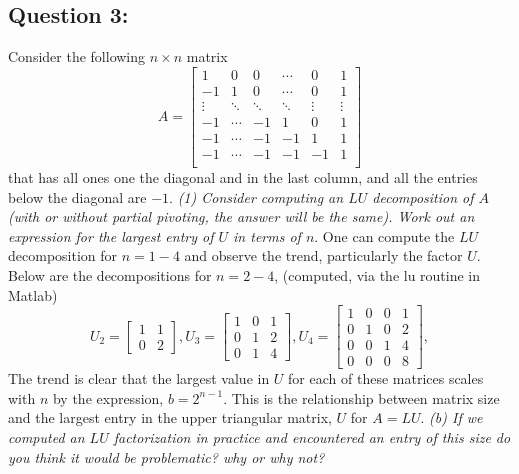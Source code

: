 \documentclass{article}
\begin{document}
\subsection*{Question 3:}
Consider the following $n \times n$ matrix
\[
A = \begin{bmatrix}
1 & 0 & 0 & \cdots & 0 & 1 \\
-1 & 1 & 0 & \cdots & 0 & 1 \\
\vdots & \ddots & \ddots & \ddots & \vdots & \vdots \\
-1  & \cdots & -1 & 1 & 0  & 1 \\
-1  & \cdots & -1 & -1 & 1  & 1 \\
-1  & \cdots & -1 & -1 & -1  & 1 \\
\end{bmatrix}
\]
that has all ones one the diagonal and in the last column, and all the entries below the diagonal are $-1.$ \newline 
\emph{ (1) Consider computing an $LU$ decomposition of $A$ (with or without partial pivoting, the answer will be the same). Work out an expression for the largest entry of $U$ in terms of $n.$ }    
\newline
\newline 
One can compute the $LU$ decomposition for $n=1-4$ and observe the trend, particularly the factor $U$. Below are the decompositions for $n=2 -4$,  (computed, via the lu routine in Matlab)
$$  U_{2} = \begin{bmatrix}
1 & 1 \\
0 & 2 
\end{bmatrix}, 
U_{3} = 
\begin{bmatrix}
1 & 0 &1 \\
0 & 1 & 2 \\ 
 0 & 1 & 4  
\end{bmatrix},  
U_{4} = 
\begin{bmatrix}
1 & 0 & 0 & 1 \\
0 & 1 & 0 & 2 \\ 
 0 & 0 & 1 & 4 \\ 
  0 & 0 & 0 & 8 
\end{bmatrix}, 
$$  
The trend is clear that the largest value in $U$ for each of these matrices scales with $n$ by the expression, $b = 2^{n-1}$. This is the relationship between matrix size and the largest entry in the upper triangular matrix, $U$ for $A = LU$. 
\newline \newline 
\emph{(b) If we computed an $LU$ factorization in practice and encountered an entry of this size do you think it would be problematic? why or why not?}  \newline   
\end{document}
